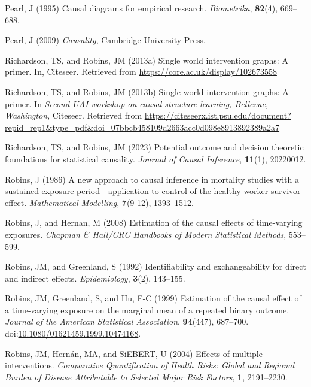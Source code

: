 \documentclass[
  single column]{article}
\newlength{\cslhangindent}
\newenvironment{CSLReferences}[2] %
 {\begin{list}{}{%
  \setlength{\itemindent}{0pt}
  \setlength{\leftmargin}{0pt}
  \setlength{\parsep}{0pt}
  \ifodd #1
   \setlength{\leftmargin}{\cslhangindent}
   \setlength{\itemindent}{-1\cslhangindent}
  \fi
  \setlength{\itemsep}{#2\baselineskip}}}
 {\end{list}}
\begin{document}
\begin{CSLReferences}{1}{0}
Pearl, J (1995) Causal diagrams for empirical research.
\emph{Biometrika}, \textbf{82}(4), 669--688.

Pearl, J (2009) \emph{Causality}, Cambridge University Press.

Richardson, TS, and Robins, JM (2013a) Single world intervention graphs:
A primer. In, Citeseer. Retrieved from
\url{https://core.ac.uk/display/102673558}

Richardson, TS, and Robins, JM (2013b) Single world intervention graphs:
A primer. In \emph{Second UAI workshop on causal structure learning,
{B}ellevue, {W}ashington}, Citeseer. Retrieved from
\url{https://citeseerx.ist.psu.edu/document?repid=rep1&type=pdf&doi=07bbcb458109d2663acc0d098e8913892389a2a7}

Richardson, TS, and Robins, JM (2023) Potential outcome and decision
theoretic foundations for statistical causality. \emph{Journal of Causal
Inference}, \textbf{11}(1), 20220012.

Robins, J (1986) A new approach to causal inference in mortality studies
with a sustained exposure period---application to control of the healthy
worker survivor effect. \emph{Mathematical Modelling}, \textbf{7}(9-12),
1393--1512.

Robins, J, and Hernan, M (2008) Estimation of the causal effects of
time-varying exposures. \emph{Chapman \& Hall/CRC Handbooks of Modern
Statistical Methods}, 553--599.

Robins, JM, and Greenland, S (1992) Identifiability and exchangeability
for direct and indirect effects. \emph{Epidemiology}, \textbf{3}(2),
143--155.

Robins, JM, Greenland, S, and Hu, F-C (1999) Estimation of the causal
effect of a time-varying exposure on the marginal mean of a repeated
binary outcome. \emph{Journal of the American Statistical Association},
\textbf{94}(447), 687--700.
doi:\href{https://doi.org/10.1080/01621459.1999.10474168}{10.1080/01621459.1999.10474168}.

Robins, JM, Hernán, MA, and SiEBERT, U (2004) Effects of multiple
interventions. \emph{Comparative Quantification of Health Risks: Global
and Regional Burden of Disease Attributable to Selected Major Risk
Factors}, \textbf{1}, 2191--2230.


\end{CSLReferences}
\end{document}
